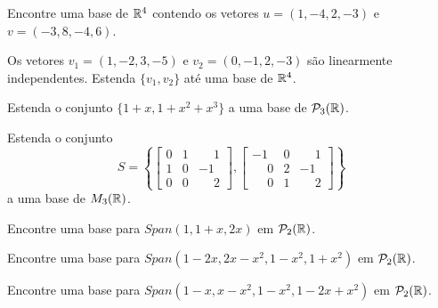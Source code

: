 \documentclass[12pt]{exam}
\begin{document}
    \begin{exercicio}
        Encontre uma base de $\mathbb{R}^4$ contendo os vetores $u = (1, -4, 2, -3)$ e $v = (-3, 8, -4, 6)$.
    \end{exercicio}

    \begin{exercicio}
        Os vetores $v_1 = (1, -2, 3, -5)$ e $v_2 = (0, -1, 2, -3)$ são linearmente independentes. Estenda $\{v_1, v_2\}$ até uma base de $\mathbb{R}^4$.
    \end{exercicio}

    \begin{exercicio}
        Estenda o conjunto $\{1 + x, 1 + x^2 + x^3\}$ a uma base de $\mathcal{P}_3(\mathbb{R})$.
    \end{exercicio}

    \begin{exercicio}
        Estenda o conjunto
        \[
        S = \left\{
        \begin{bmatrix}
            0 & 1 & \phantom{-} 1\\
            1 & 0 & -1\\
            0 & 0 & \phantom{-} 2
        \end{bmatrix},
        \begin{bmatrix}
            -1 & 0 & \phantom{-} 1\\
            \phantom{-} 0 & 2 & -1\\
            \phantom{-} 0 & 1 & \phantom{-} 2
        \end{bmatrix}
        \right\}
        \]
        a uma base de $M_3(\mathbb{R})$.
    \end{exercicio}

    \begin{exercicio}
        Encontre uma base para $Span(1, 1 + x, 2x)$ em $\mathcal{P}_2(\mathbb{R})$.
    \end{exercicio}

    \begin{exercicio}
        Encontre uma base para $Span(1 - 2x, 2x - x^2, 1 - x^2, 1 + x^2)$ em $\mathcal{P}_2(\mathbb{R})$.
    \end{exercicio}

    \begin{exercicio}
        Encontre uma base para $Span(1 - x, x - x^2, 1 - x^2, 1 - 2x + x^2)$ em $\mathcal{P}_2(\mathbb{R})$.
    \end{exercicio}
\end{document}
